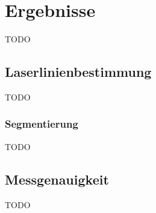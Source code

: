 \chapter{Ergebnisse}
TODO

\section{Laserlinienbestimmung}
TODO

\subsection{Segmentierung}
\label{subsec:segmentierung}
TODO

\section{Messgenauigkeit}
TODO